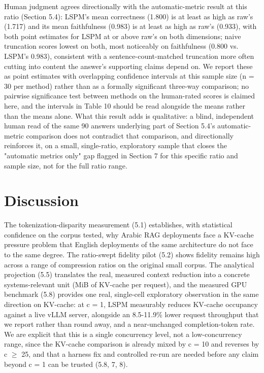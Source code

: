Human judgment agrees directionally with the automatic-metric result at this ratio (Section 5.4): LSPM's mean correctness (1.800) is at least as high as raw's (1.717) and its mean faithfulness (0.983) is at least as high as raw's (0.933), with both point estimates for LSPM at or above raw's on both dimensions; naive truncation scores lowest on both, most noticeably on faithfulness (0.800 vs. LSPM's 0.983), consistent with a sentence-count-matched truncation more often cutting into content the answer's supporting claims depend on. We report these as point estimates with overlapping confidence intervals at this sample size (n = 30 per method) rather than as a formally significant three-way comparison; no pairwise significance test between methods on the human-rated scores is claimed here, and the intervals in Table 10 should be read alongside the means rather than the means alone. What this result adds is qualitative: a blind, independent human read of the same 90 answers underlying part of Section 5.4's automatic-metric comparison does not contradict that comparison, and directionally reinforces it, on a small, single-ratio, exploratory sample that closes the "automatic metrics only" gap flagged in Section 7 for this specific ratio and sample size, not for the full ratio range.

\section{Discussion}
The tokenization-disparity measurement (5.1) establishes, with statistical confidence on the corpus tested, why Arabic RAG deployments face a KV-cache pressure problem that English deployments of the same architecture do not face to the same degree. The ratio-swept fidelity pilot (5.2) shows fidelity remains high across a range of compression ratios on the original small corpus. The analytical projection (5.5) translates the real, measured context reduction into a concrete systems-relevant unit (MiB of KV-cache per request), and the measured GPU benchmark (5.8) provides one real, single-cell exploratory observation in the same direction on KV-cache: at c = 1, LSPM measurably reduces KV-cache occupancy against a live vLLM server, alongside an 8.5-11.9\% lower request throughput that we report rather than round away, and a near-unchanged completion-token rate. We are explicit that this is a single concurrency level, not a low-concurrency range, since the KV-cache comparison is already mixed by c = 10 and reverses by c $\geq$ 25, and that a harness fix and controlled re-run are needed before any claim beyond c = 1 can be trusted (5.8, 7, 8).

